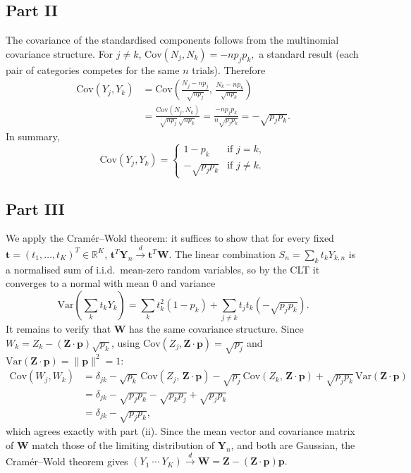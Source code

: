 \documentclass[letterpaper]{article}
\begin{document}
			
			\clearpage
			\subsection{Part II}
			
			 The covariance of the standardised components follows from the multinomial covariance structure.
			For $j \neq k$,
			$
			\mathrm{Cov}(N_j, N_k) = -np_jp_k,
			$
			a standard result (each pair of categories competes for the same $n$ trials). Therefore
			\begin{align*}
				\mathrm{Cov}(Y_j, Y_k)
				&= \mathrm{Cov}\!\left(\frac{N_j - np_j}{\sqrt{np_j}},\,
				\frac{N_k - np_k}{\sqrt{np_k}}\right) \\[4pt]
				&= \frac{\mathrm{Cov}(N_j, N_k)}{\sqrt{np_j}\,\sqrt{np_k}}
				= \frac{-np_jp_k}{n\sqrt{p_jp_k}}
				= -\sqrt{p_jp_k}.
			\end{align*}
			In summary,
			\[
			\mathrm{Cov}(Y_j, Y_k) =
			\begin{cases}
				1 - p_k         & \text{if } j = k, \\
				-\sqrt{p_j p_k} & \text{if } j \neq k.
			\end{cases} 
			\]
			
		\clearpage
		\subsection{Part III}
		
		 We apply the Cram\'{e}r--Wold theorem: it suffices to show that for every fixed $\mathbf{t} =
			(t_1,\ldots,t_K)^T \in \mathbb{R}^K$,
			$
			\mathbf{t}^T \mathbf{Y}_n \xrightarrow{d} \mathbf{t}^T \mathbf{W}.
			$
			The linear combination $S_n = \sum_k t_k Y_{k,n}$ is a normalised sum of i.i.d.\ mean-zero
			random variables, so by the CLT it converges to a normal with mean $0$ and variance
			\[
			\mathrm{Var}\!\left(\sum_k t_k Y_k\right)
			= \sum_k t_k^2(1-p_k) + \sum_{j\neq k} t_j t_k (-\sqrt{p_jp_k}).
			\]
			It remains to verify that $\mathbf{W}$ has the same covariance structure. Since
			$W_k = Z_k - (\mathbf{Z}\cdot\mathbf{p})\sqrt{p_k}$, using
			$\mathrm{Cov}(Z_j, \mathbf{Z}\cdot\mathbf{p}) = \sqrt{p_j}$ and
			$\mathrm{Var}(\mathbf{Z}\cdot\mathbf{p}) = \|\mathbf{p}\|^2 = 1$:
			\begin{align*}
				\mathrm{Cov}(W_j, W_k)
				&= \delta_{jk}
				- \sqrt{p_k}\,\mathrm{Cov}(Z_j,\, \mathbf{Z}\cdot\mathbf{p})
				- \sqrt{p_j}\,\mathrm{Cov}(Z_k,\, \mathbf{Z}\cdot\mathbf{p})
				+ \sqrt{p_jp_k}\,\mathrm{Var}(\mathbf{Z}\cdot\mathbf{p}) \\
				&= \delta_{jk} - \sqrt{p_jp_k} - \sqrt{p_kp_j} + \sqrt{p_jp_k} \\
				&= \delta_{jk} - \sqrt{p_jp_k},
			\end{align*}
			which agrees exactly with part (ii). Since the mean vector and covariance matrix of $\mathbf{W}$
			match those of the limiting distribution of $\mathbf{Y}_n$, and both are Gaussian, the
			Cram\'{e}r--Wold theorem gives
			$
			(Y_1\ \cdots\ Y_K) \xrightarrow{d} \mathbf{W} = \mathbf{Z} - (\mathbf{Z}\cdot\mathbf{p})\mathbf{p}. 
			$
			
\end{document}
